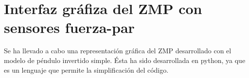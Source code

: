 \appendix












\section{Interfaz gráfiza del ZMP con sensores fuerza-par}\label{aped.D}

Se ha llevado a cabo una representación gráfica del ZMP desarrollado con el modelo de péndulo invertido simple. Ésta ha sido desarrollada en python, ya que es un lenguaje que permite la simplificación del código.

